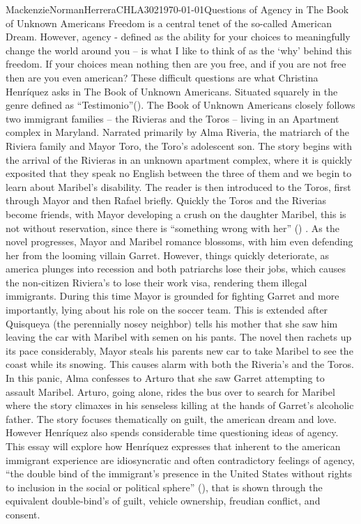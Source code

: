 \documentclass{article}
\begin{document}
\begin{mla}{Mackenzie}{Norman}{Herrera}{CHLA302}{\today}{Questions of Agency in The Book of Unknown Americans}
Freedom is a central tenet of the so-called American Dream. However, agency - defined as the ability for your choices to  meaningfully change the world around you -- is what I like to think of as the `why' behind this freedom. If your choices mean nothing then are you free, and if you are not free then are you even american? These difficult questions are what Christina Henríquez asks in The Book of Unknown Americans. Situated squarely in the genre defined as ``Testimonio''(\cite{testimonio}). The Book of Unknown Americans closely follows two immigrant families -- the Rivieras and the Toros -- living in an Apartment complex in Maryland. Narrated primarily by Alma Riveria, the matriarch of the Riviera family and Mayor Toro, the Toro's adolescent son. The story begins with the arrival of the Rivieras in an unknown apartment complex, where it is quickly exposited that they speak no English between the three of them and we begin to learn about Maribel's disability. The reader is then introduced to the Toros, first through Mayor and then Rafael briefly. Quickly the Toros and the Riverias become friends, with Mayor developing a crush on the daughter Maribel, this is not without reservation, since there is ``something wrong with her'' (\cite{Henriquez2014-sh}) . As the novel progresses, Mayor and Maribel romance blossoms, with him even defending her from the looming villain Garret. However, things quickly deteriorate, as america plunges into recession and both patriarchs lose their jobs, which causes the non-citizen Riviera's to lose their work visa, rendering them illegal immigrants. During this time Mayor is grounded for fighting Garret and more importantly, lying about his role on the soccer team. This is extended after Quisqueya (the perennially nosey neighbor) tells his mother that she saw him   leaving the car with Maribel with semen on his pants. The novel then rachets up its pace considerably, Mayor steals his parents new car to take Maribel to see the coast while its snowing. This causes alarm with both the Riveria's and the Toros. In this panic, Alma confesses to Arturo that she saw Garret attempting to assault Maribel. Arturo, going alone, rides the bus over to search for Maribel where the story climaxes in his senseless killing at the hands of Garret's alcoholic father. The story focuses thematically on guilt, the american dream and love. However Henríquez also spends considerable time questioning ideas of agency. This essay will explore how Henríquez expresses that inherent to the american immigrant experience are idiosyncratic and often contradictory feelings of agency, ``the double bind of the immigrant’s presence in the United States without rights to inclusion in the social or political sphere'' (\cite{Lutes_Travis_2021}), that is shown through the equivalent double-bind's of guilt, vehicle ownership, freudian conflict, and consent.



\end{mla}
\end{document}
